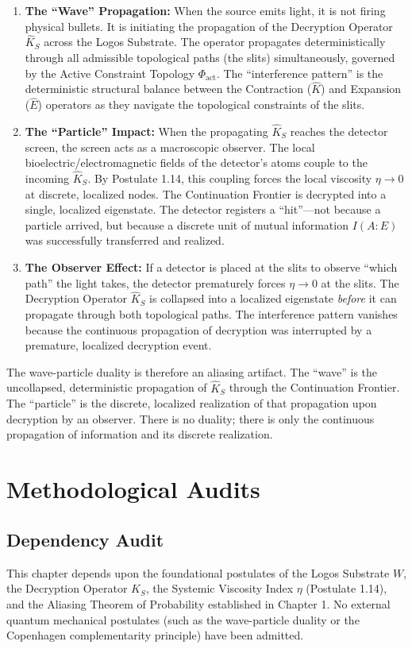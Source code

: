 \documentclass[12pt,twoside]{extbook}
\theoremstyle{definition}
\theoremstyle{remark}
\begin{document}
\begin{enumerate}
    \item \textbf{The ``Wave'' Propagation:} When the source emits light, it is not firing physical bullets. It is initiating the propagation of the Decryption Operator $\hat{K}_S$ across the Logos Substrate. The operator propagates deterministically through all admissible topological paths (the slits) simultaneously, governed by the Active Constraint Topology $\Phi_{\text{act}}$. The ``interference pattern'' is the deterministic structural balance between the Contraction ($\hat{K}$) and Expansion ($\hat{E}$) operators as they navigate the topological constraints of the slits.
    \item \textbf{The ``Particle'' Impact:} When the propagating $\hat{K}_S$ reaches the detector screen, the screen acts as a macroscopic observer. The local bioelectric/electromagnetic fields of the detector's atoms couple to the incoming $\hat{K}_S$. By Postulate 1.14, this coupling forces the local viscosity $\eta \to 0$ at discrete, localized nodes. The Continuation Frontier is decrypted into a single, localized eigenstate. The detector registers a ``hit''---not because a particle arrived, but because a discrete unit of mutual information $I(A:E)$ was successfully transferred and realized.
    \item \textbf{The Observer Effect:} If a detector is placed at the slits to observe ``which path'' the light takes, the detector prematurely forces $\eta \to 0$ at the slits. The Decryption Operator $\hat{K}_S$ is collapsed into a localized eigenstate \textit{before} it can propagate through both topological paths. The interference pattern vanishes because the continuous propagation of decryption was interrupted by a premature, localized decryption event.
\end{enumerate}

The wave-particle duality is therefore an aliasing artifact. The ``wave'' is the uncollapsed, deterministic propagation of $\hat{K}_S$ through the Continuation Frontier. The ``particle'' is the discrete, localized realization of that propagation upon decryption by an observer. There is no duality; there is only the continuous propagation of information and its discrete realization.

\section{Methodological Audits}

\subsection*{Dependency Audit}
This chapter depends upon the foundational postulates of the Logos Substrate $W$, the Decryption Operator $\hat{K}_S$, the Systemic Viscosity Index $\eta$ (Postulate 1.14), and the Aliasing Theorem of Probability established in Chapter 1. No external quantum mechanical postulates (such as the wave-particle duality or the Copenhagen complementarity principle) have been admitted. 
\end{document}
